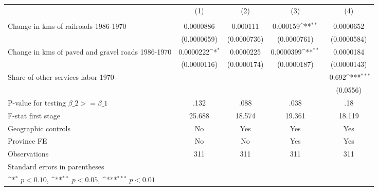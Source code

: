 {
\def\sym#1{\ifmmode^{#1}\else\(^{#1}\)\fi}
\begin{tabular}{l*{4}{c}}
\hline\hline
                &\multicolumn{1}{c}{(1)}&\multicolumn{1}{c}{(2)}&\multicolumn{1}{c}{(3)}&\multicolumn{1}{c}{(4)}\\
                &\multicolumn{1}{c}{}&\multicolumn{1}{c}{}&\multicolumn{1}{c}{}&\multicolumn{1}{c}{}\\
\hline
Change in kms of railroads 1986-1970&0.0000886         & 0.000111         & 0.000159\sym{**} &0.0000652         \\
                &(0.0000659)         &(0.0000736)         &(0.0000761)         &(0.0000584)         \\
[1em]
Change in kms of paved and gravel roads 1986-1970&0.0000222\sym{*}  &0.0000225         &0.0000399\sym{**} &0.0000184         \\
                &(0.0000116)         &(0.0000174)         &(0.0000187)         &(0.0000143)         \\
[1em]
Share of other services labor 1970&                  &                  &                  &   -0.692\sym{***}\\
                &                  &                  &                  & (0.0556)         \\
\hline
P-value for testing $\beta\_{2} >= \beta\_{1}$&     .132         &     .088         &     .038         &      .18         \\
F-stat first stage&   25.688         &   18.574         &   19.361         &   18.119         \\
Geographic controls&       No         &      Yes         &      Yes         &      Yes         \\
Province FE     &       No         &       No         &      Yes         &      Yes         \\
Observations    &      311         &      311         &      311         &      311         \\
\hline\hline
\multicolumn{5}{l}{\footnotesize Standard errors in parentheses}\\
\multicolumn{5}{l}{\footnotesize \sym{*} \(p<0.10\), \sym{**} \(p<0.05\), \sym{***} \(p<0.01\)}\\
\end{tabular}
}
